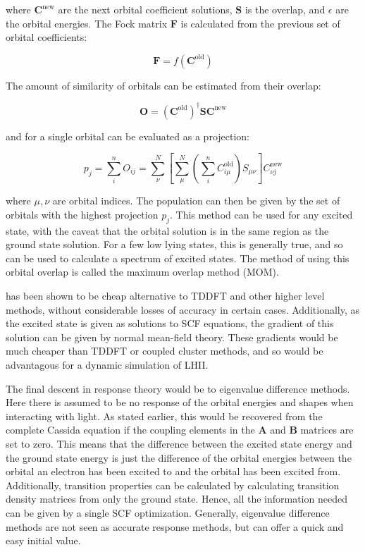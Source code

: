 where $\mathbf{C}^{\text{new}}$ are the next orbital coefficient solutions, 
$\mathbf{S}$ is the overlap, and $\epsilon$ are the orbital energies. 
The Fock matrix $\mathbf{F}$ is calculated from the previous set of orbital 
coefficients:

\begin{equation}
\mathbf{F} = f\left(\mathbf{C}^{\text{old}}\right)
\end{equation}

The amount of similarity of orbitals can be estimated from their overlap:

\begin{equation}
\mathbf{O} = \left(\mathbf{C}^{\text{old}}\right)^\dagger \mathbf{S} \mathbf{C}^{\text{new}}
\end{equation}

and for a single orbital can be evaluated as a projection:

\begin{equation}
p_j = \sum^n_i O_{ij} = \sum^N_\nu \left[\sum^N_\mu\left(\sum^n_i C_{i\mu}^{\text{old}}\right)S_{\mu\nu}\right]C^{\text{new}}_{\nu j}
\end{equation}

where $\mu,\nu$ are orbital indices. The population can then be given by the set
of orbitals with the highest projection $p_j$.  This method can be used for any
excited state, with the caveat that the orbital solution is in the same region
as the ground state solution. For a few low lying states, this is generally 
true, and so \dscf can be used to calculate a spectrum of excited states\cite{Gilbert2008}.
The method of using this orbital overlap is called the maximum overlap method (MOM).

\dscf has been shown to be cheap alternative to TDDFT and other higher level
methods, without considerable losses of accuracy in certain cases\cite{Worster2021}.
Additionally, as the excited state is given as solutions to SCF equations,
the gradient of this solution can be given by normal mean-field theory.
These gradients would be much cheaper than TDDFT or coupled cluster methods, and
so would be advantagous for a dynamic simulation of LHII.

The final descent in response theory would be to eigenvalue difference methods. 
Here there is assumed to be no response of the orbital energies and shapes when 
interacting with light. As stated earlier, this would be recovered from the
complete Cassida equation if the coupling elements in the $\mathbf{A}$ and 
$\mathbf{B}$ matrices are set to zero. This means that the difference between 
the excited state energy and the ground state energy is just the difference of
the orbital energies between the orbital an electron has been excited to and the
orbital has been excited from. Additionally, transition properties can be 
calculated by calculating transition density matrices from only the ground state.
Hence, all the information needed can be given by a single SCF optimization. 
Generally, eigenvalue difference methods are not seen as accurate response methods,
but can offer a quick and easy initial value\cite{Gimon2009}.

